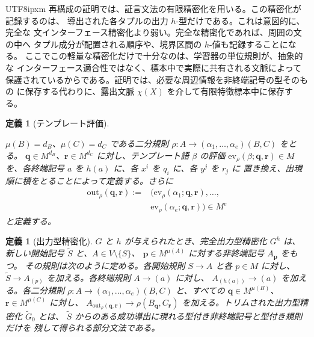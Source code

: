 \documentclass[10pt,a4paper]{article}
\newtheorem{definition}[theorem]{定義}
\theoremstyle{remark}
\newcommand{\out}{\mathrm{out}}
\newcommand{\ev}{\mathrm{ev}}
\begin{document}
\begin{CJK}{UTF8}{ipxm}
再構成の証明では、証言文法の有限精密化を用いる。この精密化が記録するのは、
導出された各タプルの出力 \(h\)-型だけである。これは意図的に、完全な
文インターフェース精密化より弱い。完全な精密化であれば、周囲の文の中へ
タプル成分が配置される順序や、境界区間の \(h\)-値も記録することになる。
ここでこの軽量な精密化だけで十分なのは、学習器の単位規則が、抽象的な
インターフェース適合性ではなく、標本中で実際に共有される文脈によって
保護されているからである。証明では、必要な周辺情報を非終端記号の型そのもの
に保存する代わりに、露出文脈 \(\chi(X)\) を介して有限特徴標本中に保存する。

\begin{definition}[テンプレート評価]
\label{def:output-map}
\leavevmode\par\noindent
\(\mu(B)=d_B\)、\(\mu(C)=d_C\) である二分規則
\(\rho\colon A\to(\alpha_1,\ldots,\alpha_e)(B,C)\) をとる。
\(\mathbf q\in M^{d_B}\)、\(\mathbf r\in M^{d_C}\) に対し、テンプレート語
\(\beta\) の評価 \(\ev_\rho(\beta;\mathbf q,\mathbf r)\in M\) を、各終端記号
\(a\) を \(h(a)\) に、各 \(x^i\) を \(q_i\) に、各 \(y^j\) を \(r_j\) に
置き換え、出現順に積をとることによって定義する。さらに
\[
\begin{aligned}
\out_\rho(\mathbf q,\mathbf r)
:={}&\bigl(\ev_\rho(\alpha_1;\mathbf q,\mathbf r),\ldots,\\
&\ev_\rho(\alpha_e;\mathbf q,\mathbf r)\bigr)\in M^e
\end{aligned}
\]
と定義する。
\end{definition}

\begin{definition}[出力型精密化]
\label{def:output-refinement}
\(G\) と \(h\) が与えられたとき、完全出力型精密化 \(G^h\) は、新しい開始記号
\(\widetilde S\) と、\(A\in V\setminus\{S\}\)、
\(\mathbf p\in M^{\mu(A)}\) に対する非終端記号 \(A_{\mathbf p}\) をもつ。
その規則は次のように定める。各開始規則 \(S\to A\) と各 \(p\in M\) に対し、
\(\widetilde S\to A_{(p)}\) を加える。各終端規則 \(A\to(a)\) に対し、
\(A_{(h(a))}\to(a)\) を加える。各二分規則
\(\rho\colon A\to(\alpha_1,\ldots,\alpha_e)(B,C)\) と、すべての
\(\mathbf q\in M^{\mu(B)}\)、\(\mathbf r\in M^{\mu(C)}\) に対し、
\(A_{\out_\rho(\mathbf q,\mathbf r)}\to\rho(B_{\mathbf q},C_{\mathbf r})\)
を加える。トリムされた出力型精密化 \(\widetilde G_0\) とは、
\(\widetilde S\) からのある成功導出に現れる型付き非終端記号と型付き規則だけを
残して得られる部分文法である。
\end{definition}


\end{CJK}
\end{document}

